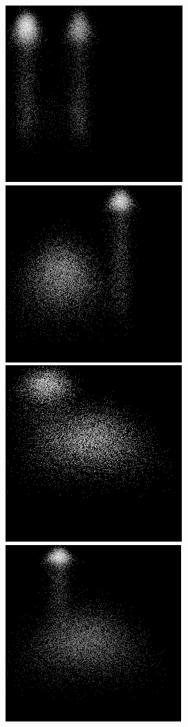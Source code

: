 \documentclass[a4paper,12pt]{report}
\begin{document}
\begin{figure}[htp]
  \centering
	\includegraphics[scale=0.35]{image/hd0.png}
	\includegraphics[scale=0.35]{image/hd1.png}
	\includegraphics[scale=0.35]{image/hd2.png}
	\includegraphics[scale=0.35]{image/hd3.png}

\end{figure}
\end{document}
